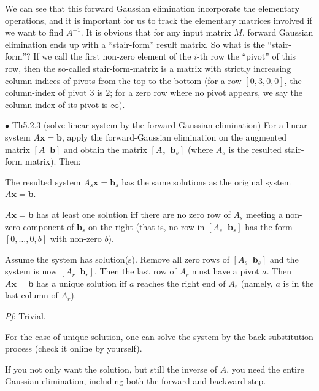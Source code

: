 \documentclass{article}
\begin{document}
\begin{Rmk}{}
    We can see that this forward Gaussian elimination incorporate the elementary operations, and it is important for us to track the elementary matrices involved if we want to find $A^{-1}$.
    \textcolor{Th}{It is obvious that for any input matrix $M$, forward Gaussian elimination ends up with a ``stair-form'' result matrix.} So what is the ``stair-form''? \textcolor{Df}{If we call the first non-zero element of the $i$-th row the ``pivot'' of this row, then the so-called stair-form-matrix is a matrix with strictly increasing column-indices of pivots from the top to the bottom (for a row $[0,3,0,0]$, the column-index of pivot $3$ is $2$; for a zero row where no pivot appears, we say the column-index of its pivot is $\infty$).}
\end{Rmk}

\begin{Th}{$\bullet$ Th5.2.3 (solve linear system by the forward Gaussian elimination)}
    For a linear system $A\pmb{x} = \pmb{b}$, apply the forward-Gaussian elimination on the augmented matrix $[A\;\;\pmb{b}]$ and obtain the matrix $[A_s\;\; \pmb{b}_s]$ (where $A_s$ is the resulted stair-form matrix). Then:
    \begin{compactenum}
        \item The resulted system $A_s\pmb{x} = \pmb{b}_s$ has the same solutions as the original system $A\pmb{x} = \pmb{b}$.
        \item $A\pmb{x} = \pmb{b}$ has at least one solution iff there are no zero row of $A_s$ meeting a non-zero component of $\pmb{b}_s$ on the right (that is, no row in $[A_s\;\;\pmb{b}_s]$ has the form $[0, \dots, 0, b]$ with non-zero $b$).
        \item Assume the system has solution(s). Remove all zero rows of $[A_s\;\;\pmb{b}_s]$ and the system is now $[A_r\;\;\pmb{b}_r]$. Then the last row of $A_r$ must have a pivot $a$. Then $A\pmb{x} = \pmb{b}$ has a unique solution iff $a$ reaches the right end of $A_r$ (namely, $a$ is in the last column of $A_r$). 
    \end{compactenum}
    \tcblower
    \textit{Pf}: Trivial.
\end{Th}

\begin{Rmk}{}
    \begin{compactitem}
        \item For the case of unique solution, one can solve the system by the back substitution process (check it online by yourself).
        \item If you not only want the solution, but still the inverse of $A$, you need the entire Gaussian elimination, including both the forward and backward step.
    \end{compactitem}
\end{Rmk}
\end{document}

